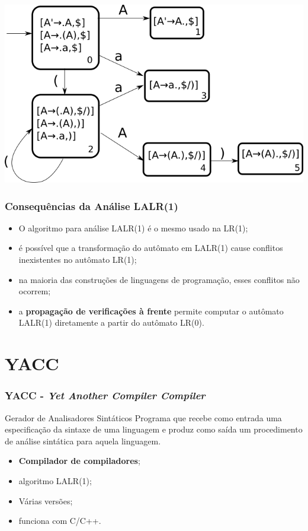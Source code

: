 \documentclass[table]{beamer}
\begin{document}
\begin{frame}
   \includegraphics[width=\linewidth,height=\textheight,keepaspectratio]{figuras/aadfalalr1.png}
\end{frame}

\begin{frame}
   \frametitle{Consequências da Análise LALR(1)}
   \begin{itemize}
      \item O algoritmo para análise LALR(1) é o mesmo usado na LR(1);
      \item é possível que a transformação do autômato em LALR(1) cause conflitos inexistentes no autômato LR(1);
      \item na maioria das construções de linguagens de programação, esses conflitos não ocorrem;
      \item a \textbf{propagação de verificações à frente} permite computar o autômato LALR(1) diretamente a partir do autômato LR(0).
   \end{itemize}
\end{frame}

\section{YACC}

\begin{frame}
   \frametitle{YACC - \textit{Yet Another Compiler Compiler}}
   \begin{block}{Gerador de Analisadores Sintáticos}
      Programa que recebe como entrada uma especificação da sintaxe de uma linguagem e produz como saída um procedimento de análise sintática para aquela linguagem. \\ 
   \end{block}
   \begin{itemize}
      \item \textbf{Compilador de compiladores};
      \item algoritmo LALR(1);
      \item Várias versões;
      \item funciona com C/C++.
   \end{itemize}
\end{frame}
\end{document}
